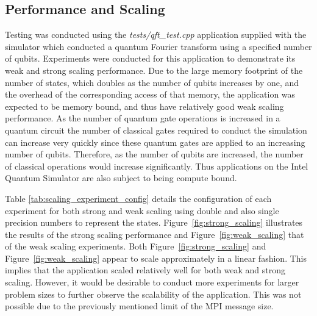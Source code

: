 \subsection{Performance and Scaling}
\label{sec:performance_and_scaling}
Testing was conducted using the \textit{tests/qft\_test.cpp} application supplied with the simulator which conducted a quantum Fourier transform using a specified number of qubits. Experiments were conducted for this application to demonstrate its weak and strong scaling performance. Due to the large memory footprint of the number of states, which doubles as the number of qubits increases by one, and the overhead of the corresponding access of that memory, the application was expected to be memory bound, and thus have relatively good weak scaling performance. As the number of quantum gate operations is increased in a quantum circuit the number of classical gates required to conduct the simulation can increase very quickly since these quantum gates are applied to an increasing number of qubits. Therefore, as the number of qubits are increased, the number of classical operations would increase significantly. Thus applications on the Intel Quantum Simulator are also subject to being compute bound.

Table \ref{tab:scaling_experiment_config} details the configuration of each experiment for both strong and weak scaling using double and also single precision numbers to represent the states. Figure~\ref{fig:strong_scaling} illustrates the results of the strong scaling performance and Figure~\ref{fig:weak_scaling} that of the weak scaling experiments.
Both Figure~\ref{fig:strong_scaling} and Figure~\ref{fig:weak_scaling} appear to scale approximately in a linear fashion. This implies that the application scaled relatively well for both weak and strong scaling. However, it would be desirable to conduct more experiments for larger problem sizes to further observe the scalability of the application. This was not possible due to the previously mentioned limit of the MPI message size.

